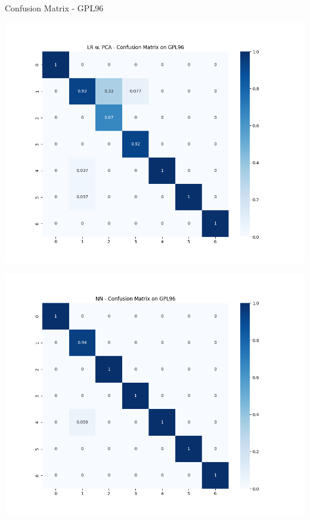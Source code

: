 \documentclass{beamer}
\begin{document}
    \begin{frame}{Confusion Matrix - GPL96}
        \begin{center}
            \hspace{-70pt}
            \begin{minipage}{0.4\textwidth}
                \includegraphics[scale=.3]{LRGPL96confusion.png}
            \end{minipage}
            \hspace{30pt}
            \begin{minipage}{0.4\textwidth}
                \includegraphics[scale=.3]{NNGPL96confusion.png}
            \end{minipage}
        \end{center}
    \end{frame}
\end{document}
